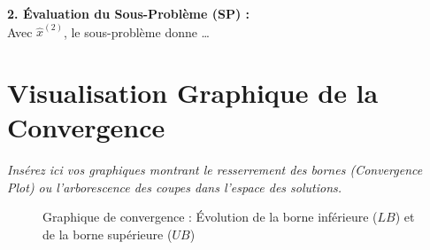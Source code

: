 \documentclass[11pt,a4paper]{article}
\begin{document}
\noindent \textbf{2. Évaluation du Sous-Problème (SP) :} \\
Avec $\hat{x}^{(2)}$, le sous-problème donne \dots

\vspace{0.6cm}

\section{Visualisation Graphique de la Convergence}
\label{sec:visualisation}
\textit{Insérez ici vos graphiques montrant le resserrement des bornes (Convergence Plot) ou l'arborescence des coupes dans l'espace des solutions.}

\begin{figure}[h!]
    \centering
    \begin{minipage}{0.75\linewidth}
        \centering
        \color{slate}
    \end{minipage}
    \caption{Graphique de convergence : Évolution de la borne inférieure ($LB$) et de la borne supérieure ($UB$)}
    \label{fig:convergence}
\end{figure}
\end{document}
